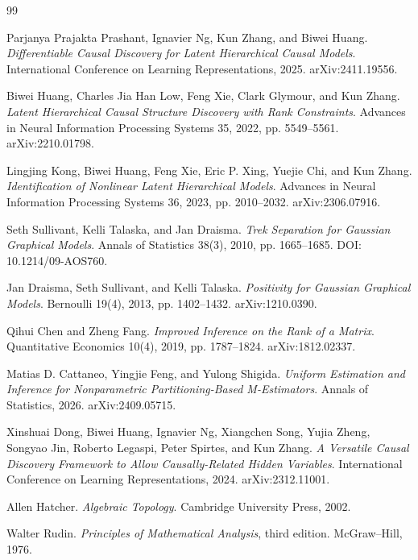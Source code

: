\documentclass{article}
\begin{document}
\begin{thebibliography}{99}

   Parjanya Prajakta Prashant, Ignavier Ng, Kun Zhang, and Biwei Huang. \emph{Differentiable Causal Discovery for Latent Hierarchical Causal Models}. International Conference on Learning Representations, 2025. arXiv:2411.19556.

   Biwei Huang, Charles Jia Han Low, Feng Xie, Clark Glymour, and Kun Zhang. \emph{Latent Hierarchical Causal Structure Discovery with Rank Constraints}. Advances in Neural Information Processing Systems 35, 2022, pp. 5549--5561. arXiv:2210.01798.

   Lingjing Kong, Biwei Huang, Feng Xie, Eric P. Xing, Yuejie Chi, and Kun Zhang. \emph{Identification of Nonlinear Latent Hierarchical Models}. Advances in Neural Information Processing Systems 36, 2023, pp. 2010--2032. arXiv:2306.07916.

   Seth Sullivant, Kelli Talaska, and Jan Draisma. \emph{Trek Separation for Gaussian Graphical Models}. Annals of Statistics 38(3), 2010, pp. 1665--1685. DOI: 10.1214/09-AOS760.

   Jan Draisma, Seth Sullivant, and Kelli Talaska. \emph{Positivity for Gaussian Graphical Models}. Bernoulli 19(4), 2013, pp. 1402--1432. arXiv:1210.0390.

   Qihui Chen and Zheng Fang. \emph{Improved Inference on the Rank of a Matrix}. Quantitative Economics 10(4), 2019, pp. 1787--1824. arXiv:1812.02337.

   Matias D. Cattaneo, Yingjie Feng, and Yulong Shigida. \emph{Uniform Estimation and Inference for Nonparametric Partitioning-Based M-Estimators}. Annals of Statistics, 2026. arXiv:2409.05715.

   Xinshuai Dong, Biwei Huang, Ignavier Ng, Xiangchen Song, Yujia Zheng, Songyao Jin, Roberto Legaspi, Peter Spirtes, and Kun Zhang. \emph{A Versatile Causal Discovery Framework to Allow Causally-Related Hidden Variables}. International Conference on Learning Representations, 2024. arXiv:2312.11001.

   Allen Hatcher. \emph{Algebraic Topology}. Cambridge University Press, 2002.

   Walter Rudin. \emph{Principles of Mathematical Analysis}, third edition. McGraw--Hill, 1976.

\end{thebibliography}
\end{document}
